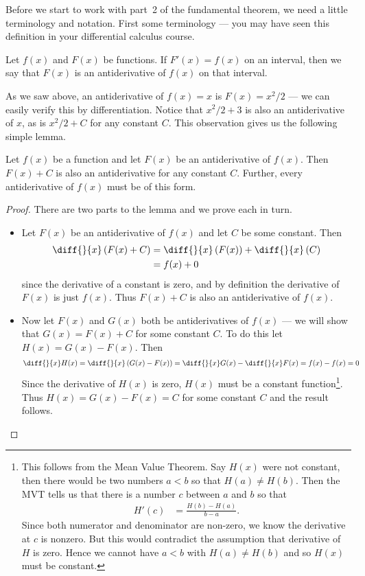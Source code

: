 Before we start to work with part~2 of the fundamental theorem, we need a little
terminology and notation. First some terminology --- you may have seen this
definition in your differential calculus course.
\begin{defn}[Antiderivatives]
 Let $f(x)$ and $F(x)$ be functions. If $F'(x)=f(x)$ on an interval, then we
say that $F(x)$ is an antiderivative of $f(x)$ on that interval.
\end{defn}
As we saw above, an antiderivative of $f(x)=x$ is $F(x) = x^2/2$ --- we can
easily verify this by differentiation. Notice that $x^2/2 + 3$ is also an
antiderivative of $x$, as is $x^2/2 + C$ for any constant $C$. This observation
gives us the following simple lemma.
\begin{lemma}\label{lemma:+C}
 Let $f(x)$ be a function and let $F(x)$ be an antiderivative of $f(x)$. Then
$F(x)+C$ is also an antiderivative for any constant $C$. Further, every antiderivative of
$f(x)$ must be of this form.
\end{lemma}
\begin{proof}
There are two parts to the lemma and we prove each in turn.
\begin{itemize}
 \item Let $F(x)$ be an antiderivative of $f(x)$ and let $C$ be some constant. Then
\begin{align*}
  \diff{}{x}\left( F(x) + C \right)
  &=   \diff{}{x}\left( F(x) \right)  +  \diff{}{x}\left( C \right) \\
  &= f(x) + 0
\end{align*}
since the derivative of a constant is zero, and by definition the derivative of $F(x)$ is
just $f(x)$. Thus $F(x)+C$ is also an antiderivative of $f(x)$.
\item Now let $F(x)$ and $G(x)$ both be antiderivatives of $f(x)$ --- we will show that
$G(x) = F(x)+C$ for some constant $C$. To do this let $H(x) = G(x)-F(x)$. Then
\begin{align*}
\diff{}{x}H(x)
&= \diff{}{x}\left( G(x)-F(x) \right)
= \diff{}{x} G(x) - \diff{}{x}F(x)
= f(x) - f(x) = 0
\end{align*}
Since the derivative of $H(x)$ is zero, $H(x)$ must be a constant
function\footnote{This follows from the Mean Value Theorem. Say $H(x)$ were not constant,
then there would be two numbers $a<b$ so that $H(a)\neq H(b)$. Then the MVT tells us that
there is a number $c$ between $a$ and $b$ so that
\begin{align*}
  H'(c) &= \frac{H(b)-H(a)}{b-a}.
\end{align*}
Since both numerator and denominator are non-zero, we know the derivative at $c$ is
nonzero. But this would contradict the assumption that derivative of $H$ is zero. Hence
we cannot have $a<b$ with $H(a)\neq H(b)$ and so $H(x)$ must be constant.
}. Thus $H(x)=G(x)-F(x)=C$ for
some constant $C$ and the result follows.
\end{itemize}


\end{proof}

